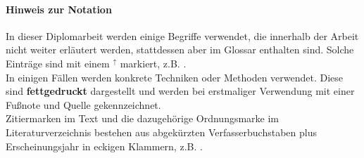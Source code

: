 \paragraph{Hinweis zur Notation} In dieser Diplomarbeit werden einige Begriffe verwendet, die innerhalb der Arbeit nicht weiter erläutert werden, stattdessen aber im Glossar enthalten sind. Solche Einträge sind mit einem $^\uparrow$ markiert, z.B. .\\
In einigen Fällen werden konkrete Techniken oder Methoden verwendet. Diese sind \textbf{fettgedruckt} dargestellt und werden bei erstmaliger Verwendung mit einer Fußnote und Quelle gekennzeichnet.\\
Zitiermarken im Text und die dazugehörige Ordnungsmarke im Literaturverzeichnis bestehen aus abgekürzten Verfasserbuchstaben plus Erscheinungsjahr in eckigen Klammern, z.B. \citep{beck_test_2002}.
